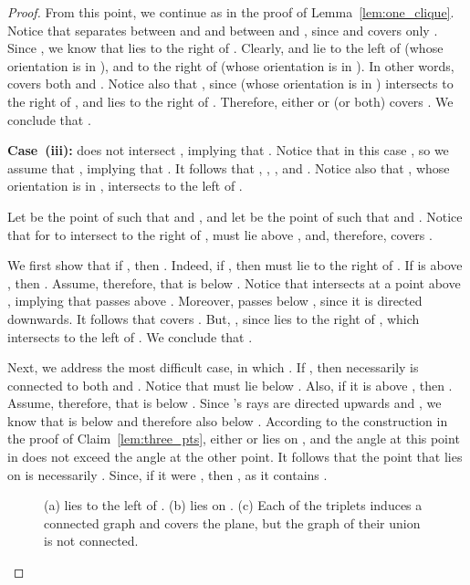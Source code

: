 \documentclass[11pt]{article}
\begin{document}
\begin{proof}
From this point, we continue as in the proof of Lemma~\ref{lem:one_clique}.  
Notice that  separates between  and  and between  and , since  and  covers only . Since , we know that  lies to the right of . Clearly,  and  lie to the left of  (whose orientation is in ), and to the right of  (whose orientation is in ). In other words,  covers both  and . Notice also that , since  (whose orientation is in ) intersects  to the right of , and  lies to the right of . Therefore, either  or  (or both) covers . We conclude that .  


{\bf Case~(iii):}  does not intersect , implying that .
Notice that in this case , so we assume that
, implying that . 
It follows that , , , and . 
Notice also that , whose orientation is in , intersects  to the left of .

Let  be the point of  such that  and , and let  be the point of  such that  and . 
Notice that for  to intersect  to the right of ,  must lie above , and, therefore,  covers .

We first show that if , then .
Indeed, if , then  must lie to the right of . 
If  is above , then . Assume, therefore, that  is below . Notice that  intersects  at a point above , implying that  passes above . Moreover,  passes below , since it is directed downwards. It follows that  covers . But, , since  lies to the right of , which intersects  to the left of . We conclude that .

Next, we address the most difficult case, in which .
If , then necessarily  is connected to both  and . 
Notice that  must lie below . Also, if it is above , then . Assume, therefore, that  is below .
Since 's rays are directed upwards and , we know that  is below  and therefore also below . 
According to the construction in the proof of Claim~\ref{lem:three_pts}, either  or  lies on , and the angle at this point in  does not exceed the angle at the other point. It follows that the point that lies on  is necessarily . Since, if it were , then , as it contains .


\begin{figure}[htp]
\centering

   \caption{(a)  lies to the left of . (b)  lies on . (c)
Each of the triplets induces a connected graph and covers the plane, but the graph of their union is not connected.}
\end{figure}


\end{proof}
\end{document}
